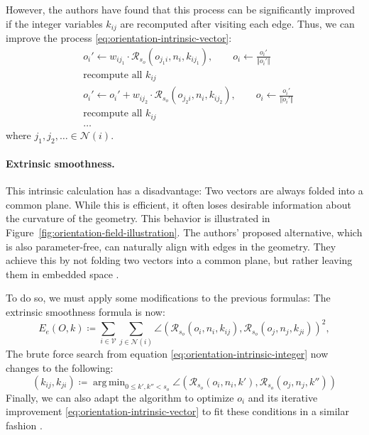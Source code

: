 \documentclass{ACGSeminar}
\DeclareMathOperator*{\argmin}{arg\,min}
\begin{document}
However, the authors have found that this process can be significantly improved if the integer variables $k_{ij}$ are recomputed after visiting each edge. Thus, we can improve the process \eqref{eq:orientation-intrinsic-vector}:
\begin{equation}
\begin{split}
	& o_i' \leftarrow w_{ij_1} \cdot \mathcal{R}_{s_o}(o_{j_1i}, n_i, k_{ij_1}), \qquad o_i \leftarrow \frac{o_i'}{\Vert o_i' \Vert}\\
	& \textrm{recompute all } k_{ij}\\
	& o_i' \leftarrow o_i' + w_{ij_2} \cdot \mathcal{R}_{s_o}(o_{j_2i}, n_i, k_{ij_2}), \qquad o_i \leftarrow \frac{o_i'}{\Vert o_i' \Vert}\\
	& \textrm{recompute all } k_{ij}\\
	& \dots
\end{split}
\end{equation}
where $j_1, j_2, \dots \in \mathcal{N}(i)$.

\paragraph{Extrinsic smoothness.}
This intrinsic calculation has a disadvantage: Two vectors are always folded into a common plane. While this is efficient, it often loses desirable information about the curvature of the geometry. This behavior is illustrated in Figure~\ref{fig:orientation-field-illustration}. The authors' proposed alternative, which is also parameter-free, can naturally align with edges in the geometry. They achieve this by not folding two vectors into a common plane, but rather leaving them in embedded space \cite{jakob2015instant}.\bigskip

To do so, we must apply some modifications to the previous formulas:
The extrinsic smoothness formula is now:
\begin{equation}\label{eq:orientation-extrinsic-energy}
	E_e(O,k) \coloneqq \sum_{i \in \mathcal{V}} \sum_{j \in \mathcal{N}(i)} \angle(\mathcal{R}_{s_o}(o_{i}, n_i, k_{ij}), \mathcal{R}_{s_o}(o_{j}, n_j, k_{ji}))^2,
\end{equation}
The brute force search from equation \eqref{eq:orientation-intrinsic-integer} now changes to the following:
\begin{equation}\label{eq:orientation-extrinsic-integer}
	(k_{ij}, k_{ji}) \coloneqq \argmin_{0 \leq k',k'' < s_o} \angle(\mathcal{R}_{s_o}(o_i, n_i, k'), \mathcal{R}_{s_o}(o_j, n_j, k''))
\end{equation}
Finally, we can also adapt the algorithm to optimize $o_i$ and its iterative improvement \eqref{eq:orientation-intrinsic-vector} to fit these conditions in a similar fashion \cite{jakob2015instant}.
\end{document}

